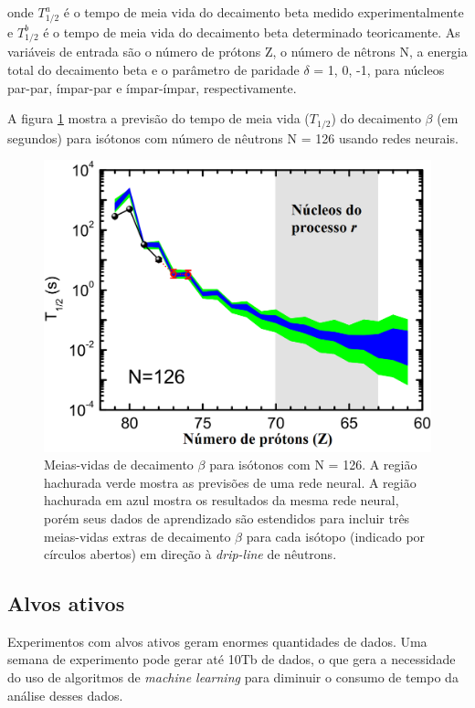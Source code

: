 \documentclass[a4paper,12pt,oneside]{book}
\begin{document}
onde $T^{a}_{1/2}$ é o tempo de meia vida do decaimento beta medido experimentalmente e $T^{b}_{1/2}$ é o tempo de meia vida do decaimento beta determinado teoricamente. As variáveis de entrada são o número de prótons Z, o número de nêtrons N, a energia total do decaimento beta e o parâmetro de paridade $\delta$ = 1, 0, -1, para núcleos par-par, ímpar-par e ímpar-ímpar, respectivamente.

\par A figura \ref{fig:beta_decay} mostra a previsão do tempo de meia vida ($T_{1/2}$) do decaimento $\beta$ (em segundos) para isótonos com número de nêutrons N = 126 usando redes neurais.

\begin{figure}[H]
    \centering
    \includegraphics[scale = 0.35]{figs/beta_predict_2.png}
    \caption{Meias-vidas de decaimento $\beta$ para isótonos com N = 126. A região hachurada verde mostra as previsões de uma rede neural. A região hachurada em azul mostra os resultados da mesma rede neural, porém seus dados de aprendizado são estendidos para incluir três meias-vidas extras de decaimento $\beta$ para cada isótopo (indicado por círculos abertos) em direção à \textit{drip-line} de nêutrons\cite{mlbetadecay}.}
    \label{fig:beta_decay}
\end{figure}

\subsection{Alvos ativos}

\par Experimentos com alvos ativos geram enormes quantidades de dados. Uma semana de experimento pode gerar até 10Tb de dados\cite{KUCHERAML}, o que gera a necessidade do uso de algoritmos de \textit{machine learning} para diminuir o consumo de tempo da análise desses dados.
\end{document}
